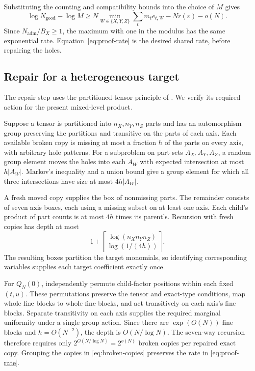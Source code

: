 \documentclass[11pt,a4paper]{article}
\newcommand{\Ngood}{N_{\mathrm{good}}}
\newcommand{\Nadm}{N_{\mathrm{adm}}}
\newcommand{\WW}{\{X,Y,Z\}}
\begin{document}
Substituting the counting and compatibility bounds into the choice of $M$ gives
\begin{equation}\label{eq:proof-rate}
\log\Ngood-\log M\ge
N\min_{W\in\WW}\sum_t m_te_{t,W}
-Nr(\varepsilon)-o(N).
\end{equation}
Since $\Nadm/B_X\ge1$, the maximum with one in the modulus has the same exponential rate. Equation~\eqref{eq:proof-rate} is the desired shared rate, before repairing the holes.

\subsection{Repair for a heterogeneous target}

The repair step uses the partitioned-tensor principle of \citet[Section~7]{vxxz2024}. We verify its required action for the present mixed-level product.

Suppose a tensor is partitioned into $n_X,n_Y,n_Z$ parts and has an automorphism group preserving the partitions and transitive on the parts of each axis. Each available broken copy is missing at most a fraction $h$ of the parts on every axis, with arbitrary hole patterns. For a subproblem on part sets $A_X,A_Y,A_Z$, a random group element moves the holes into each $A_W$ with expected intersection at most $h|A_W|$. Markov's inequality and a union bound give a group element for which all three intersections have size at most $4h|A_W|$.

A fresh moved copy supplies the box of nonmissing parts. The remainder consists of seven axis boxes, each using a missing subset on at least one axis. Each child's product of part counts is at most $4h$ times its parent's. Recursion with fresh copies has depth at most
\begin{equation}
1+\left\lceil\frac{\log(n_Xn_Yn_Z)}{\log(1/(4h))}\right\rceil.
\end{equation}
The resulting boxes partition the target monomials, so identifying corresponding variables supplies each target coefficient exactly once.

For $Q_N(0)$, independently permute child-factor positions within each fixed $(t,u)$. These permutations preserve the tensor and exact-type conditions, map whole fine blocks to whole fine blocks, and act transitively on each axis's fine blocks. Separate transitivity on each axis supplies the required marginal uniformity under a single group action. Since there are $\exp(O(N))$ fine blocks and $h=O(N^{-2})$, the depth is $O(N/\log N)$. The seven-way recursion therefore requires only $2^{O(N/\log N)}=2^{o(N)}$ broken copies per repaired exact copy. Grouping the copies in \cref{eq:broken-copies} preserves the rate in \cref{eq:proof-rate}.
\end{document}
